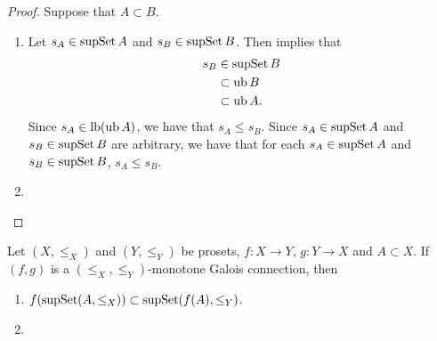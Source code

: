 \documentclass{book}
\begin{document}
	\begin{proof}
		Suppose that $A \subset B$. 
		\begin{enumerate}
			\item Let $s_A \in \operatorname{supSet} A$ and $s_B \in \operatorname{supSet} B$. Then  implies that 
			\begin{align*}
				s_B
				& \in \operatorname{supSet} B \\
				& \subset \operatorname{ub} B \\
				& \subset \operatorname{ub} A. 
			\end{align*}
			Since $s_A \in \operatorname{lb}(\operatorname{ub} A)$, we have that $s_A \leq s_B$. Since $s_A \in \operatorname{supSet} A$ and $s_B \in \operatorname{supSet} B$ are arbitrary, we have that for each $s_A \in \operatorname{supSet} A$ and $s_B \in \operatorname{supSet} B$, $s_A \leq s_B$.
			\item {}
		\end{enumerate}
	\end{proof}
	
	\begin{ex} 
		Let $(X, \leq_X)$ and $(Y, \leq_Y)$ be prosets, $f: X \rightarrow Y$, $g:Y \rightarrow X$ and $A \subset X$. If $(f,g)$ is a $(\leq_X, \leq_Y)$-monotone Galois connection, then 
		\begin{enumerate}
			\item $f(\operatorname{supSet} (A, \leq_X)) \subset \operatorname{supSet}(f(A), \leq_Y)$. 
			\item {}
		\end{enumerate}
	\end{ex}
	
\end{document}
